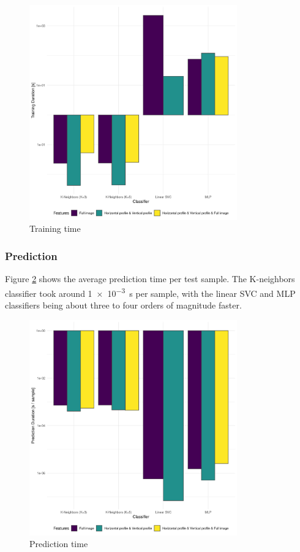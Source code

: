 \documentclass[a4paper]{scrreprt}
\begin{document}
\begin{figure}[h]
        \centering
		\includegraphics[width=0.8\textwidth]{../resources/scikit_training_timings.png}
		\caption{Training time}
		\label{fig:training_time}
\end{figure}

\subsubsection{Prediction}

Figure \ref{fig:prediction_time} shows the average prediction time per test
sample. The K-neighbors classifier took around \SI{1e-3}{\s} per sample, with
the linear SVC and MLP classifiers being about three to four orders of
magnitude faster.

\begin{figure}[h]
        \centering
		\includegraphics[width=0.8\textwidth]{../resources/scikit_prediction_timings.png}
		\caption{Prediction time}
		\label{fig:prediction_time}
\end{figure}
\end{document}
